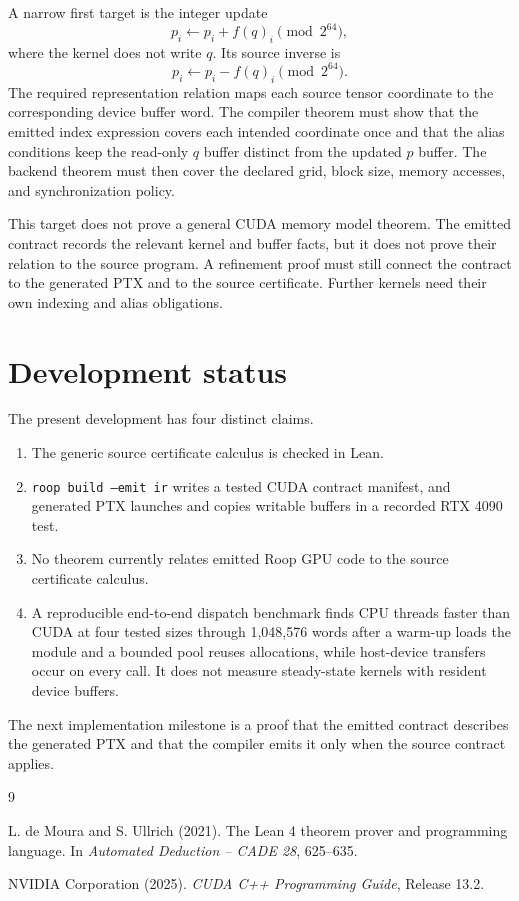 \documentclass[aop,preprint]{../aop-template/imsart}
\theoremstyle{definition}
\begin{document}
A narrow first target is the integer update
\[
 p_i\leftarrow p_i+f(q)_i\pmod {2^{64}},
\]
where the kernel does not write $q$. Its source inverse is
\[
 p_i\leftarrow p_i-f(q)_i\pmod {2^{64}}.
\]
The required representation relation maps each source tensor coordinate to the corresponding device buffer word. The compiler theorem must show that the emitted index expression covers each intended coordinate once and that the alias conditions keep the read-only $q$ buffer distinct from the updated $p$ buffer. The backend theorem must then cover the declared grid, block size, memory accesses, and synchronization policy.

This target does not prove a general CUDA memory model theorem. The emitted contract records the relevant kernel and buffer facts, but it does not prove their relation to the source program. A refinement proof must still connect the contract to the generated PTX and to the source certificate. Further kernels need their own indexing and alias obligations.

\section{Development status}

The present development has four distinct claims.
\begin{enumerate}
\item The generic source certificate calculus is checked in Lean.
\item \texttt{roop build --emit ir} writes a tested CUDA contract manifest, and generated PTX launches and copies writable buffers in a recorded RTX 4090 test.
\item No theorem currently relates emitted Roop GPU code to the source certificate calculus.
\item A reproducible end-to-end dispatch benchmark finds CPU threads faster than CUDA at four tested sizes through 1,048,576 words after a warm-up loads the module and a bounded pool reuses allocations, while host-device transfers occur on every call. It does not measure steady-state kernels with resident device buffers.
\end{enumerate}

The next implementation milestone is a proof that the emitted contract describes the generated PTX and that the compiler emits it only when the source contract applies.

\begin{thebibliography}{9}

L. de Moura and S. Ullrich (2021).
The Lean 4 theorem prover and programming language.
In \textit{Automated Deduction -- CADE 28}, 625--635.

NVIDIA Corporation (2025).
\textit{CUDA C++ Programming Guide}, Release 13.2.

\end{thebibliography}
\end{document}
